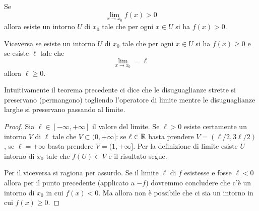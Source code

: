 \begin{theorem}%
\mymark{***}%
%
%
%
Se
\[
  \lim_{x\to x_0} f(x) > 0
\]
allora esiste un intorno $U$ di $x_0$ tale che 
per ogni $x\in U$ si ha $f(x) > 0$.

Viceversa se esiste un intorno $U$ di $x_0$ tale che per ogni $x \in U$  
si ha $f(x)\ge 0$ e se esiste $\ell$ tale che 
\[
    \lim_{x\to x_0} = \ell
\]
allora $\ell\ge 0$.
\end{theorem}
%
Intuitivamente il teorema precedente ci dice che le disuguaglianze strette 
si preservano (permangono) togliendo l'operatore di limite mentre 
le disuguaglianze larghe si preservano passando al limite.
%
\begin{proof}
Sia $\ell\in [-\infty,+\infty]$ il valore del limite.
Se $\ell>0$ esiste certamente un intorno $V$ di $\ell$ 
tale che $V\subset (0,+\infty]$: se $\ell\in {\mathbb R}$ basta prendere 
$V=(\ell/2,3 \ell/2)$, se $\ell=+\infty$ basta prendere $V=(1,+\infty]$.
Per la definizione di limite esiste $U$ intorno di $x_0$ 
tale che $f(U)\subset V$ e il risultato segue.

Per il viceversa si ragiona per assurdo. 
Se il limite $\ell$ di $f$ esistesse e fosse $\ell < 0$
allora per il punto precedente (applicato a $-f$) dovremmo 
concludere che c'è un intorno di $x_0$ in cui $f(x)<0$.
Ma allora non è possibile che ci sia un intorno in cui $f(x)\ge 0$.
\end{proof}

